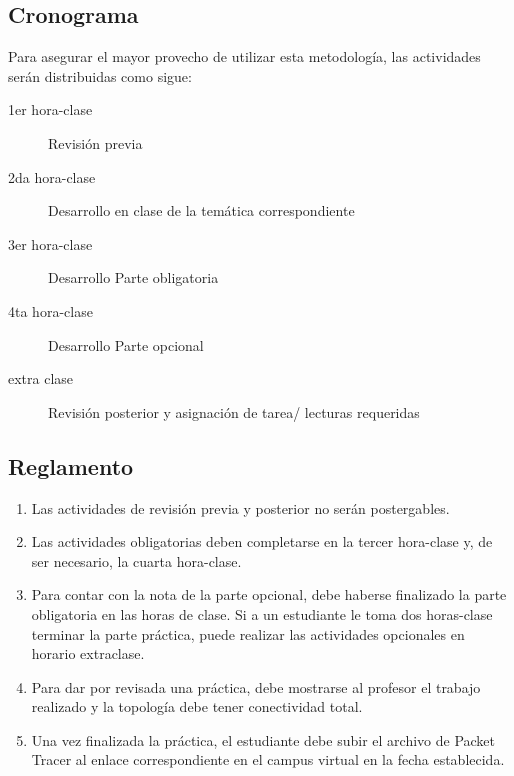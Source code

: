 \documentclass[12pt]{article}
\begin{document}
\subsection{Cronograma}
Para asegurar el mayor provecho de utilizar esta metodología, las actividades serán distribuidas como sigue:
\begin{description}
\item[1er hora-clase]  Revisión previa
\item[2da hora-clase] Desarrollo en clase de la temática correspondiente  
\item[3er hora-clase]  Desarrollo Parte obligatoria
\item[4ta hora-clase]  Desarrollo Parte opcional
\item[extra clase] Revisión posterior y asignación de tarea/ lecturas requeridas
\end{description}

\subsection{Reglamento}
\begin{enumerate}
\item Las actividades de revisión previa y posterior no serán postergables.
\item Las actividades obligatorias deben completarse en la tercer hora-clase y, de ser necesario, la cuarta hora-clase.
\item Para contar con la nota de la parte opcional, debe haberse finalizado la parte obligatoria en las horas de clase. Si a un estudiante le toma dos horas-clase terminar la parte práctica, puede realizar las actividades opcionales en horario extraclase.
\item Para dar por revisada una práctica, debe mostrarse al profesor el trabajo realizado y la topología debe tener conectividad total.
\item Una vez finalizada la práctica, el estudiante debe subir el archivo de Packet Tracer al enlace correspondiente en el campus virtual en la fecha establecida.
\end{enumerate}


\end{document}
